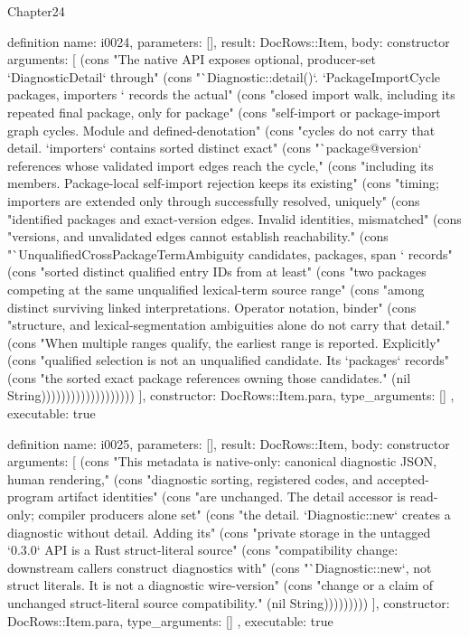 \begin{lexlean}{Chapter24}
\begin{semanticmodule}
definition{
  name: i0024,
  parameters: [],
  result: DocRows::Item,
  body: constructor{
    arguments: [
      (cons "The native API exposes optional, producer-set `DiagnosticDetail` through" (cons "`Diagnostic::detail()`. `PackageImportCycle { packages, importers }` records the actual" (cons "closed import walk, including its repeated final package, only for package" (cons "self-import or package-import graph cycles. Module and defined-denotation" (cons "cycles do not carry that detail. `importers` contains sorted distinct exact" (cons "`package@version` references whose validated import edges reach the cycle," (cons "including its members. Package-local self-import rejection keeps its existing" (cons "timing; importers are extended only through successfully resolved, uniquely" (cons "identified packages and exact-version edges. Invalid identities, mismatched" (cons "versions, and unvalidated edges cannot establish reachability." (cons "`UnqualifiedCrossPackageTermAmbiguity { candidates, packages, span }` records" (cons "sorted distinct qualified entry IDs from at least" (cons "two packages competing at the same unqualified lexical-term source range" (cons "among distinct surviving linked interpretations. Operator notation, binder" (cons "structure, and lexical-segmentation ambiguities alone do not carry that detail." (cons "When multiple ranges qualify, the earliest range is reported. Explicitly" (cons "qualified selection is not an unqualified candidate. Its `packages` records" (cons "the sorted exact package references owning those candidates." (nil String)))))))))))))))))))
    ],
    constructor: DocRows::Item.para,
    type_arguments: []
  },
  executable: true
}

definition{
  name: i0025,
  parameters: [],
  result: DocRows::Item,
  body: constructor{
    arguments: [
      (cons "This metadata is native-only: canonical diagnostic JSON, human rendering," (cons "diagnostic sorting, registered codes, and accepted-program artifact identities" (cons "are unchanged. The detail accessor is read-only; compiler producers alone set" (cons "the detail. `Diagnostic::new` creates a diagnostic without detail. Adding its" (cons "private storage in the untagged `0.3.0` API is a Rust struct-literal source" (cons "compatibility change: downstream callers construct diagnostics with" (cons "`Diagnostic::new`, not struct literals. It is not a diagnostic wire-version" (cons "change or a claim of unchanged struct-literal source compatibility." (nil String)))))))))
    ],
    constructor: DocRows::Item.para,
    type_arguments: []
  },
  executable: true
}


\end{semanticmodule}
\end{lexlean}
